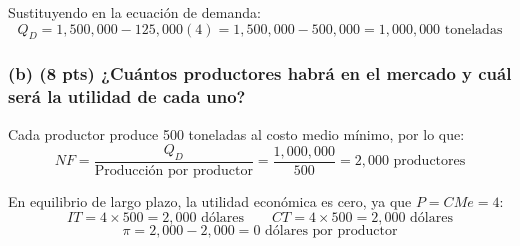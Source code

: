 \documentclass[12pt,letterpaper]{article}
\begin{document}
Sustituyendo en la ecuación de demanda:
\[
Q_D = 1{,}500{,}000 - 125{,}000(4) = 1{,}500{,}000 - 500{,}000 = \boxed{1{,}000{,}000 \text{ toneladas}}
\]

\subsubsection*{(b) (8 pts) ¿Cuántos productores habrá en el mercado y cuál será la utilidad de cada uno?}

Cada productor produce 500 toneladas al costo medio mínimo, por lo que:
\[
NF = \frac{Q_D}{\text{Producción por productor}} = \frac{1{,}000{,}000}{500} = \boxed{2{,}000 \text{ productores}}
\]

En equilibrio de largo plazo, la utilidad económica es cero, ya que $P = CMe = 4$:
\[
IT = 4 \times 500 = 2{,}000 \text{ dólares}
\qquad
CT = 4 \times 500 = 2{,}000 \text{ dólares}
\]
\[
\pi = 2{,}000 - 2{,}000 = \boxed{0 \text{ dólares por productor}}
\]
\end{document}
